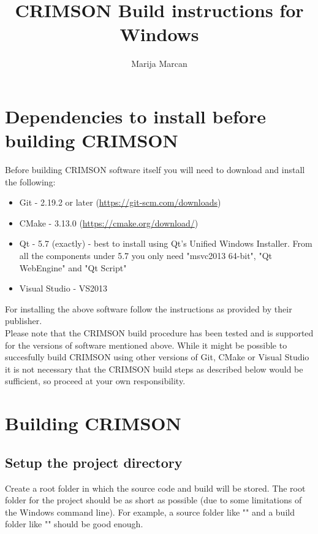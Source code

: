 \documentclass[]{scrartcl}
\title{CRIMSON Build instructions for Windows}
\author{Marija Marcan}
\begin{document}
\maketitle

\begin{abstract}

\end{abstract}

\section{Dependencies to install before building CRIMSON}
Before building CRIMSON software itself you will need to download and install the following:

\begin{itemize}
	\item Git - 2.19.2 or later (\url{https://git-scm.com/downloads})
	\item CMake - 3.13.0 (\url{https://cmake.org/download/})
	\item Qt - 5.7 (exactly) - best to install using Qt's Unified Windows Installer. From all the components under 5.7 you only need "msvc2013 64-bit", "Qt WebEngine" and "Qt Script"
	\item Visual Studio - VS2013 
\end{itemize}



For installing the above software follow the instructions as provided by their publisher.
\linebreak
\\
Please note that the CRIMSON build procedure has been tested and is supported for the versions of software mentioned above. While it might be possible to succesfully build CRIMSON using other versions of Git, CMake or Visual Studio it is not necessary that the CRIMSON build steps as described below would be sufficient, so proceed at your own responsibility.

\section{Building CRIMSON}
\subsection{Setup the project directory}
Create a root folder in which the source code and build will be stored.
The root folder for the project should be as short as possible (due to some limitations of the Windows command line). 
For example, a source folder like "" and a build folder like "" should be good enough.
\end{document}
